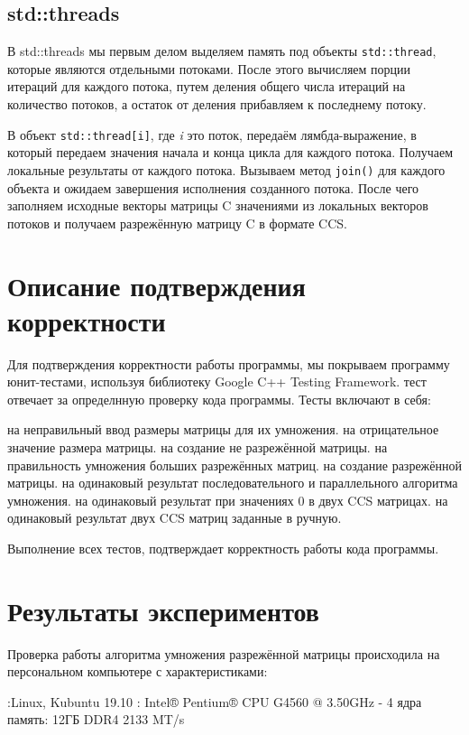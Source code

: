 \documentclass[14pt,a4paper,report]{ncc}
\begin{document}
	
	\subsection*{std::threads}
	В std::threads мы первым делом выделяем память под объекты \verb|std::thread|, которые являются отдельными потоками. После этого вычисляем порции итераций для каждого потока, путем деления общего числа итераций на количество потоков, а остаток от деления прибавляем к последнему потоку.
	\par В объект \verb|std::thread[i]|, где \emph{i} это поток, передаём лямбда-выражение, в который передаем значения начала и конца цикла для каждого потока. Получаем локальные результаты от каждого потока. Вызываем метод \verb|join()| для каждого объекта и ожидаем завершения исполнения созданного потока. После чего заполняем исходные векторы матрицы C значениями из локальных векторов потоков и получаем разрежённую матрицу C в формате CCS.
	\newpage
	
	\section*{Описание подтверждения корректности}
	Для подтверждения корректности работы программы, мы покрываем программу юнит-тестами, используя библиотеку Google C++ Testing Framework.
	 тест отвечает за определнную проверку кода программы. Тесты включают в себя:
	\begin{itemize}
		 на неправильный ввод размеры матрицы для их умножения.
		 на отрицательное значение размера матрицы.
		 на создание не разрежённой матрицы.
		 на правильность умножения больших разрежённых матриц.
		 на создание разрежённой матрицы.
		 на одинаковый результат последовательного и параллельного алгоритма умножения.
		 на одинаковый результат при значениях 0 в двух CCS матрицах.
		 на одинаковый результат двух CCS матриц заданные в ручную. 
	\end{itemize}  
	
	\par Выполнение всех тестов, подтверждает корректность работы кода программы.
	\newpage
	
	\section*{Результаты экспериментов}
	\addcontentsline{toc}{section}{Результаты экспериментов}
	Проверка работы алгоритма умножения разрежённой матрицы происходила на персональном компьютере с характеристиками:
	\begin{itemize}
		:Linux, Kubuntu 19.10
		: Intel® Pentium® CPU G4560 @ 3.50GHz - 4 ядра
		 память: 12ГБ DDR4 2133 MT/s
	\end{itemize}
	
\end{document}
